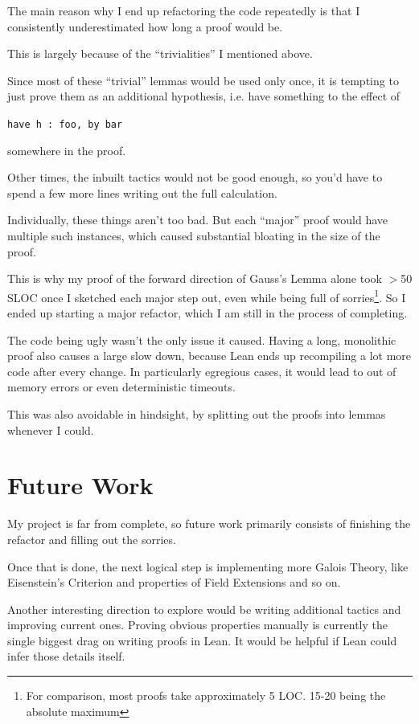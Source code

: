 \documentclass[pagesize=a4]{scrreprt}
\begin{document}
The main reason why I end up refactoring the code repeatedly is that I consistently underestimated how long a proof would be. 

This is largely because of the ``trivialities'' I mentioned above. 

Since most of these ``trivial'' lemmas would be used only once, it is tempting to just prove them as an additional hypothesis, i.e. have something to the effect of 

\begin{center}
    \texttt{have h : foo, by bar}    
\end{center}

 somewhere in the proof. 
 
 Other times, the inbuilt tactics would not be good enough, so you'd have to spend a few more lines writing out the full calculation. 

 Individually, these things aren't too bad. But each ``major'' proof would have multiple such instances, which caused substantial bloating in the size of the proof.
 
 This is why my proof of the forward direction of Gauss's Lemma alone took $>$50 SLOC once I sketched each major step out, even while being full of sorries\footnote{For comparison, most proofs take approximately 5 LOC. 15-20 being the absolute maximum}. So I ended up starting a major refactor, which I am still in the process of completing. 

The code being ugly wasn't the only issue it caused. Having a long, monolithic proof also causes a large slow down, because Lean ends up recompiling a lot more code after every change. In particularly egregious cases, it would lead to out of memory errors or even deterministic timeouts. 

 This was also avoidable in hindsight, by splitting out the proofs into lemmas whenever I could. 

 \nopagebreak


\chapter{Future Work}

My project is far from complete, so future work primarily consists of finishing the refactor and filling out the sorries. 

Once that is done, the next logical step is implementing more Galois Theory, like Eisenstein's Criterion and properties of Field Extensions and so on. 

Another interesting direction to explore would be writing additional tactics and improving current ones. Proving obvious properties manually is currently the single biggest drag on writing proofs in Lean. It would be helpful if Lean could infer those details itself.
\end{document}

